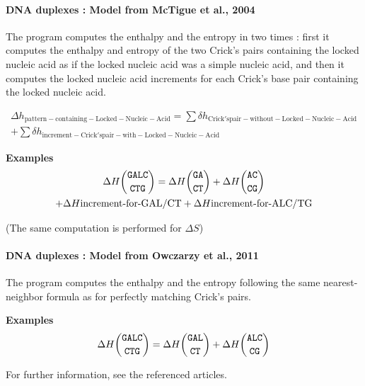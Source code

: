 \documentclass{article}
\begin{document}
\paragraph{DNA duplexes : \textbf{Model from McTigue et al., 2004}} 

The program computes the enthalpy and the entropy in two times : first it computes the enthalpy and entropy of 
the two Crick's pairs containing the locked nucleic acid as if the locked nucleic acid was a simple nucleic acid,
and then it computes the locked nucleic acid increments for each Crick's base pair containing the locked nucleic acid.

\begin{multline*}
\Delta{}h_\mathrm{pattern-containing-Locked-Nucleic-Acid} =
\sum \delta{}h_\mathrm{Crick's pair-without-Locked-Nucleic-Acid} \\ +
\sum \delta{}h_\mathrm{increment-Crick's pair-with-Locked-Nucleic-Acid}
\end{multline*}

\textbf{Examples}
\begin{multline*}
\Delta H {\mbox{\texttt{GALC}} \choose \mbox{\texttt{CTG}}} = 
\Delta H {\mbox{\texttt{GA}} \choose \mbox{\texttt{CT}}} +
\Delta H {\mbox{\texttt{AC}} \choose \mbox{\texttt{CG}}} \\ +
\Delta H {\mbox{increment-for-GAL/CT}} +
\Delta H {\mbox{increment-for-ALC/TG}}\\
\end{multline*}

       (The same computation is performed for $\Delta S$) 

\paragraph{DNA duplexes : \textbf{Model from Owczarzy et al., 2011}} 

The program computes the enthalpy and the entropy following the same nearest-neighbor formula as for perfectly matching Crick's pairs.

\textbf{Examples}
\begin{multline*}
\Delta H {\mbox{\texttt{GALC}} \choose \mbox{\texttt{CTG}}} = 
\Delta H {\mbox{\texttt{GAL}} \choose \mbox{\texttt{CT}}} +
\Delta H {\mbox{\texttt{ALC}} \choose \mbox{\texttt{CG}}} \\ 
\end{multline*}
       
For further information, see the referenced articles.
\end{document}
